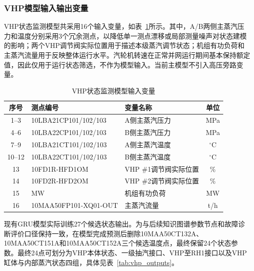 \subsubsection{VHP模型输入输出变量}

VHP状态监测模型共采用16个输入变量，如表~\ref{tab:vhp_inputs}所示。其中，A/B两侧主蒸汽压力和温度分别采用3个冗余测点，以降低单一测点漂移或局部测量噪声对状态建模的影响；两个VHP调节阀实际位置用于描述本级蒸汽调节状态；机组有功负荷和主蒸汽流量用于反映整体运行水平。汽轮机转速在正常并网运行期间基本保持额定值，因此仅用于运行状态筛选，不作为模型输入。当前主模型不引入高压旁路变量。

\begin{table}[htbp]
\centering
\caption{VHP状态监测模型输入变量}
\label{tab:vhp_inputs}
\small
\begin{tabular}{cllc}
\toprule
序号 & 测点编号 & 变量名称 & 单位\\
\midrule
1--3 & 10LBA21CP101/102/103 & A侧主蒸汽压力 & MPa\\
4--6 & 10LBA22CP101/102/103 & B侧主蒸汽压力 & MPa\\
7--9 & 10LBA21CT101/102/103 & A侧主蒸汽温度 & $^{\circ}$C\\
10--12 & 10LBA22CT101/102/103 & B侧主蒸汽温度 & $^{\circ}$C\\
13 & 10FD1R-HFD1OM & VHP \#1调节阀实际位置 & \%\\
14 & 10FD2R-HFD2OM & VHP \#2调节阀实际位置 & \%\\
15 & MW & 机组有功负荷 & MW\\
16 & 10MAA50FP101-XQ01-OUT & 主蒸汽流量 & t/h\\
\bottomrule
\end{tabular}
\end{table}

现有GRU模型实际训练27个候选状态输出。为与后续知识图谱参数节点和故障诊断评价口径保持一致，在模型完成预测后删除10MAA50CT132A、10MAA50CT151A和10MAA50CT152A三个候选温度点，最终保留24个状态参数。最终24点可划分为VHP本体状态、一级抽汽接口、VHP至RH1接口以及VHP缸体与内部蒸汽状态四组，具体见表~\ref{tab:vhp_outputs}。

